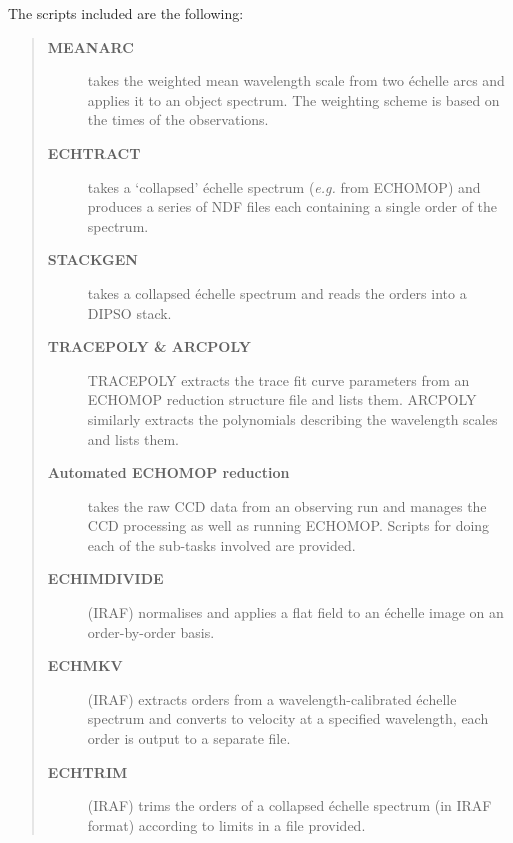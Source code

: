 \documentclass[twoside,11pt]{article}
\newcommand{\htmlref}[2]{#1}
\newcommand{\xref}[3]{#1}
\begin{document}
The scripts included are the following:

\begin{quote}
\begin{description}

\item [\htmlref{{\bf MEANARC }}{se_meanarc}]
      takes the weighted mean wavelength scale from
      two \'{e}chelle arcs and applies it to an object spectrum.
      The weighting scheme is based on the times of the observations.

\item [\htmlref{{\bf ECHTRACT}}{se_echtract}]
      takes a `collapsed' \'{e}chelle spectrum ({\it{e.g.}}
      from ECHOMOP) and produces a series of NDF files each
      containing a single order of the spectrum.

\item [\htmlref{{\bf STACKGEN}}{se_stackgen}]
      takes a collapsed \'{e}chelle spectrum and reads
      the orders into a \xref{DIPSO}{sun50}{} stack.

\item [\htmlref{{\bf TRACEPOLY \& ARCPOLY}}{se_tracepoly}]
      TRACEPOLY extracts the trace fit curve parameters from an ECHOMOP
      reduction structure file and lists them.
      ARCPOLY similarly extracts the polynomials describing the
      wavelength scales and lists them.

\item [\htmlref{{\bf Automated ECHOMOP reduction}}{se_automated_echomop}]
      takes the raw CCD data from an
      observing run and manages the CCD processing as well as running
      ECHOMOP\@.  Scripts for doing each of the sub-tasks involved
      are provided.

\item [\htmlref{{\bf ECHIMDIVIDE}}{se_echimdivide}]
      (IRAF) normalises and applies a flat field to an \'{e}chelle
      image on an order-by-order basis.

\item [\htmlref{{\bf ECHMKV}}{se_echmkv}]
      (IRAF) extracts orders from a wavelength-calibrated
      \'{e}chelle spectrum and converts to velocity at a specified
      wavelength, each order is output to a separate file.

\item [\htmlref{{\bf ECHTRIM}}{se_echtrim}]
      (IRAF) trims the orders of a collapsed \'{e}chelle
      spectrum (in IRAF format) according to limits in a file provided.

\end{description}
\end{quote}
\end{document}
